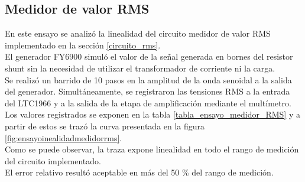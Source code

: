 \subsection{Medidor de valor RMS}\label{ensayo_medidor_rms}
En este ensayo se analiz\'{o} la linealidad del circuito medidor de valor RMS implementado en la secci\'{o}n \ref{circuito_rms}.\\
El generador FY6900 simul\'{o} el valor de la señal generada en bornes del resistor shunt sin la necesidad de utilizar el transformador de corriente ni la carga.\\
Se realiz\'{o} un barrido de 10 pasos en la amplitud de la onda senoidal a la salida del generador. Simultáneamente, se registraron las tensiones RMS a la entrada del LTC1966 y a la salida de la etapa de amplificaci\'{o}n mediante el mult\'{i}metro. Los valores registrados se exponen en la tabla \ref{tabla_ensayo_medidor_RMS} y a partir de estos se traz\'{o} la curva presentada en la figura \ref{fig:ensayoinealidadmedidorrms}.\\
Como se puede observar, la traza expone linealidad en todo el rango de medición del circuito implementado.\\
El error relativo resultó aceptable en m\'{a}s del 50 \% del rango de medición.\\
